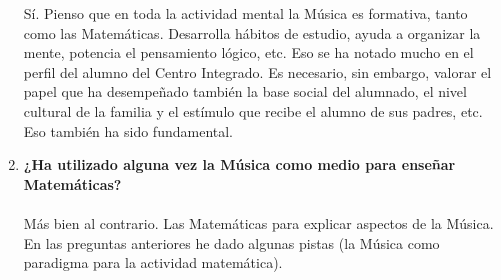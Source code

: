 \documentclass[a4paper, openright, 11pt, titlepage]{report}
\theoremstyle{definition}\newtheorem{defin}[propo]{Definition}
\theoremstyle{definition}\newtheorem{obser}[propo]{Remark}
\theoremstyle{definition}\newtheorem{ejem}[propo]{Ejemplo}
\theoremstyle{definition}\newtheorem{algoritmo}[propo]{Algoritmo}
\begin{document}
\begin{enumerate}
    Sí. Pienso que en toda la actividad mental la Música es formativa, tanto como las Matemáticas. Desarrolla hábitos de estudio, ayuda a organizar la mente, potencia el pensamiento lógico, etc. Eso se ha notado mucho en el perfil del alumno del Centro Integrado. Es necesario, sin embargo, valorar el papel que ha desempeñado también la base social del alumnado, el nivel cultural de la familia y el estímulo que recibe el alumno de sus padres, etc. Eso también ha sido fundamental.
    \item \textbf{¿Ha utilizado alguna vez la Música como medio para enseñar Matemáticas?}\\\\
    Más bien al contrario. Las Matemáticas para explicar aspectos de la Música. En las preguntas anteriores he dado algunas pistas (la Música como paradigma para la actividad matemática).
\end{enumerate}
\end{document}
